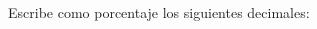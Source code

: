 \documentclass[12pt,addpoints]{evalua}
\begin{document}
\begin{questions}
    \begin{multicols}{3}
    \end{multicols}


    \question[3] Escribe como porcentaje los siguientes decimales:

    \begin{multicols}{3}
    \end{multicols}



\end{questions}
\end{document}
